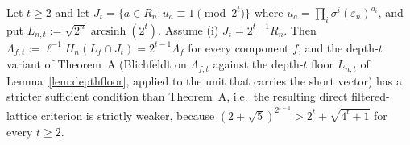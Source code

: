Let $t\ge2$ and let $J_t=\{a\in R_n: u_a\equiv1\pmod{2^t}\}$ where $u_a=\prod_i\sigma^i(\varepsilon_n)^{a_i}$, and put $L_{n,t}:=\sqrt{2^n}\operatorname{arcsinh}(2^t)$. Assume (i) $J_t=2^{t-1}R_n$. Then $\Lambda_{f,t}:=\ell^{-1}H_n(L_f\cap J_t)=2^{t-1}\Lambda_f$ for every component $f$, and the depth-$t$ variant of Theorem~A (Blichfeldt on $\Lambda_{f,t}$ against the depth-$t$ floor $L_{n,t}$ of Lemma~\ref{lem:depthfloor}, applied to the unit that carries the short vector) has a stricter sufficient condition than Theorem~A, i.e.\ the resulting direct filtered-lattice criterion is strictly weaker, because $(2+\sqrt5)^{2^{t-1}}>2^t+\sqrt{4^t+1}$ for every $t\ge2$.
